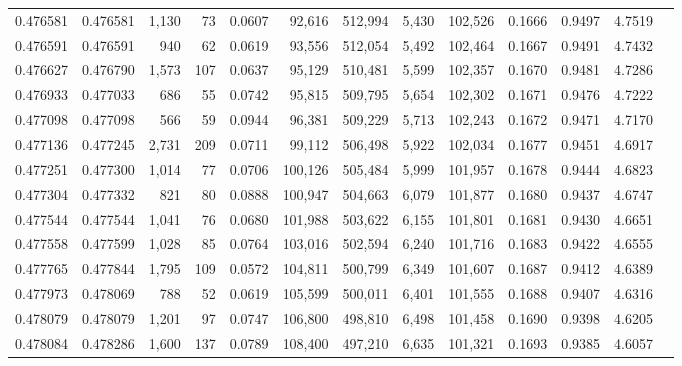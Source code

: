 \begin{tabular}{rrrrrrrrrrrrr}
0.476581 & 0.476581 & 1,130 &    73 &                                     0.0607 &  92,616 & 512,994 &   5,430 & 102,526 & 0.1666 & 0.9497 & 4.7519 \\
0.476591 & 0.476591 &   940 &    62 &                                     0.0619 &  93,556 & 512,054 &   5,492 & 102,464 & 0.1667 & 0.9491 & 4.7432 \\
0.476627 & 0.476790 & 1,573 &   107 &                                     0.0637 &  95,129 & 510,481 &   5,599 & 102,357 & 0.1670 & 0.9481 & 4.7286 \\
0.476933 & 0.477033 &   686 &    55 &                                     0.0742 &  95,815 & 509,795 &   5,654 & 102,302 & 0.1671 & 0.9476 & 4.7222 \\
0.477098 & 0.477098 &   566 &    59 &                                     0.0944 &  96,381 & 509,229 &   5,713 & 102,243 & 0.1672 & 0.9471 & 4.7170 \\
0.477136 & 0.477245 & 2,731 &   209 &                                     0.0711 &  99,112 & 506,498 &   5,922 & 102,034 & 0.1677 & 0.9451 & 4.6917 \\
0.477251 & 0.477300 & 1,014 &    77 &                                     0.0706 & 100,126 & 505,484 &   5,999 & 101,957 & 0.1678 & 0.9444 & 4.6823 \\
0.477304 & 0.477332 &   821 &    80 &                                     0.0888 & 100,947 & 504,663 &   6,079 & 101,877 & 0.1680 & 0.9437 & 4.6747 \\
0.477544 & 0.477544 & 1,041 &    76 &                                     0.0680 & 101,988 & 503,622 &   6,155 & 101,801 & 0.1681 & 0.9430 & 4.6651 \\
0.477558 & 0.477599 & 1,028 &    85 &                                     0.0764 & 103,016 & 502,594 &   6,240 & 101,716 & 0.1683 & 0.9422 & 4.6555 \\
0.477765 & 0.477844 & 1,795 &   109 &                                     0.0572 & 104,811 & 500,799 &   6,349 & 101,607 & 0.1687 & 0.9412 & 4.6389 \\
0.477973 & 0.478069 &   788 &    52 &                                     0.0619 & 105,599 & 500,011 &   6,401 & 101,555 & 0.1688 & 0.9407 & 4.6316 \\
0.478079 & 0.478079 & 1,201 &    97 &                                     0.0747 & 106,800 & 498,810 &   6,498 & 101,458 & 0.1690 & 0.9398 & 4.6205 \\
0.478084 & 0.478286 & 1,600 &   137 &                                     0.0789 & 108,400 & 497,210 &   6,635 & 101,321 & 0.1693 & 0.9385 & 4.6057 \\

\end{tabular}
